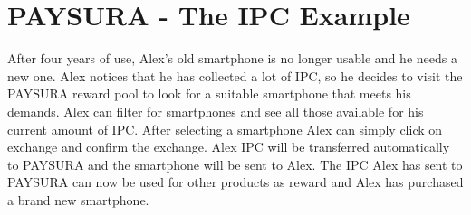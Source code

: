 \documentclass[twoside,onecolumn]{article}
\begin{document}

\section{PAYSURA - The IPC Example}

After four years of use, Alex's old smartphone is no longer usable and he needs a new one. Alex notices that he has collected a lot of IPC, so he decides to visit the PAYSURA reward pool to look for a suitable smartphone that meets his demands. Alex can filter for smartphones and see all those available for his current amount of IPC. After selecting a smartphone Alex can simply click on exchange and confirm the exchange. Alex IPC will be transferred automatically to PAYSURA and the smartphone will be sent to Alex. The IPC Alex has sent to PAYSURA can now be used for other products as reward and Alex has purchased a brand new smartphone.

\end{document}
